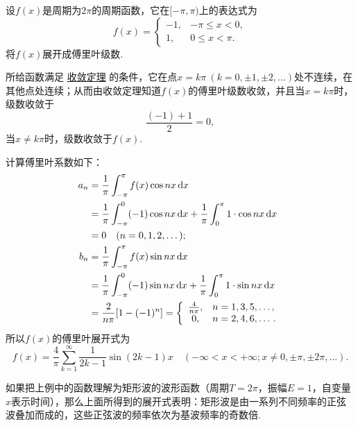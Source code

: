 \begin{example}
设\(f(x)\)是周期为\(2\pi\)的周期函数，它在\([-\pi,\pi)\)上的表达式为\[
f(x) = \left\{ \begin{array}{cc}
-1, & -\pi \leqslant x < 0, \\
1, & 0 \leqslant x < \pi.
\end{array} \right.
\]将\(f(x)\)展开成傅里叶级数.
\begin{solution}
所给函数满足 \hyperref[theorem:无穷级数.傅里叶级数收敛的狄利克雷充分条件]{收敛定理} 的条件，它在点\(x = k\pi\ (k=0,\pm1,\pm2,\dotsc)\)处不连续，在其他点处连续；从而由收敛定理知道\(f(x)\)的傅里叶级数收敛，并且当\(x = k\pi\)时，级数收敛于\[
\frac{(-1)+1}{2} = 0,
\]当\(x \neq k\pi\)时，级数收敛于\(f(x)\).

计算傅里叶系数如下：\[
\begin{split}
a_n &= \frac{1}{\pi} \int_{-\pi}^{\pi} f(x) \cos nx \dd{x} \\
&= \frac{1}{\pi} \int_{-\pi}^0 (-1) \cos nx \dd{x}
	+ \frac{1}{\pi} \int_0^{\pi} 1 \cdot \cos nx \dd{x} \\
&= 0 \quad (n=0,1,2,\dotsc); \\
b_n &= \frac{1}{\pi} \int_{-\pi}^{\pi} f(x) \sin nx \dd{x} \\
&= \frac{1}{\pi} \int_{-\pi}^0 (-1) \sin nx \dd{x}
	+ \frac{1}{\pi} \int_0^{\pi} 1 \cdot \sin nx \dd{x} \\
&= \frac{2}{n\pi} [1-(-1)^n]
= \left\{ \begin{array}{cl}
\frac{4}{n\pi}, & n=1,3,5,\dotsc, \\
0, & n=2,4,6,\dotsc.
\end{array} \right.
\end{split}
\]所以\(f(x)\)的傅里叶展开式为\[
f(x) = \frac{4}{\pi} \sum\limits_{k=1}^{\infty} \frac{1}{2k-1} \sin(2k-1) x
\quad (-\infty<x<+\infty;x\neq0,\pm\pi,\pm2\pi,\dotsc).
\]
\end{solution}
\end{example}
如果把上例中的函数理解为矩形波的波形函数（周期\(T=2\pi\)，振幅\(E=1\)，自变量\(x\)表示时间），那么上面所得到的展开式表明：矩形波是由一系列不同频率的正弦波叠加而成的，这些正弦波的频率依次为基波频率的奇数倍.

